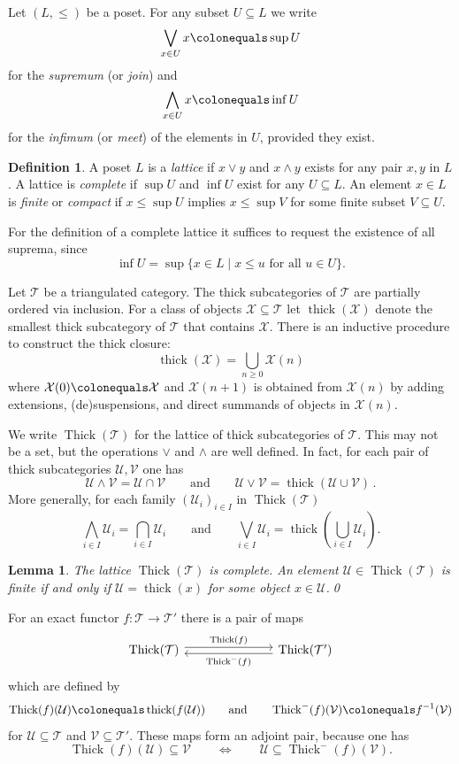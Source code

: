 \documentclass{amsart}[a4]
\newtheorem{lemma}[theorem]{Lemma}
\theoremstyle{definition}
\newtheorem{definition}[theorem]{Definition}
\theoremstyle{remark}
\numberwithin{equation}{section}
\newcommand{\thick}{\operatorname{thick}}
\newcommand{\Thick}{\operatorname{Thick}}
\newcommand{\cat}{\mathcal}
\begin{document}
Let $(L,\le)$ be a poset. For any subset $U\subseteq L$ we write
\[\bigvee_{x\in U}x\colonequals\sup U\] for the \emph{supremum} (or
\emph{join}) and
\[\bigwedge_{x\in U}x\colonequals\inf U\] for the \emph{infimum} (or
\emph{meet}) of the elements in $U$, provided they exist.

\begin{definition}
 A poset $L$ is a
\emph{lattice} if $x\vee y$ and $x\wedge y$ exists for any pair $x,y$
in $L$. A lattice is \emph{complete} if $\sup U$ and $\inf U$ exist for any
$U\subseteq L$. 
An element
$x\in L$ is \emph{finite} or \emph{compact} if $x\le \sup U$ implies
$x\le\sup V$ for some finite subset $V\subseteq U$.
\end{definition}

For the definition of a complete lattice it suffices to request the
existence of all suprema, since
\[\inf U=\sup\{x\in L\mid x\le u\text{ for all }u\in U\}.\]

Let $\cat T$ be a triangulated category. The thick subcategories of
$\cat T$ are partially ordered via inclusion.  For a class of objects
$\cat X\subseteq\cat T$ let $\thick(\cat X)$ denote the smallest thick
subcategory of $\cat T$ that contains $\cat X$. There is an inductive
procedure to construct the thick closure:
\[\thick(\cat X)=\bigcup_{n\ge 0}\cat X(n)\] where $\cat X(0)\colonequals\cat X$
and $\cat X(n+1)$ is obtained from  $\cat X(n)$ by adding
extensions, (de)suspensions, and direct summands of objects in  $\cat X(n)$.

We write $\Thick(\cat T)$ for the lattice of thick subcategories of
$\cat T$.  This may not be a set, but the operations $\vee$ and
$\wedge$ are well defined. In fact, for each pair of thick
subcategories $\cat U,\cat V$ one has
\[\cat U\wedge\cat V=\cat U\cap\cat V\qquad\text{and}\qquad \cat
  U\vee\cat V=\thick(\cat U\cup\cat V)\,.\] More generally, for each
family $(\cat U_i)_{i\in I}$ in $\Thick(\cat T)$
\[\bigwedge_{i\in I}\cat U_i=\bigcap_{i\in I}\cat
  U_i\qquad\text{and}\qquad \bigvee_{i\in I}\cat U_i=\thick\left(\bigcup_{i\in
    I}\cat U_i\right).\]

\begin{lemma}
  The lattice $\Thick(\cat T)$ is complete. An element
  $\cat U\in\Thick(\cat T)$ is finite if and only if
  $\cat U=\thick(x)$ for some object $x\in \cat U$.\qed
\end{lemma}

For an exact functor $f\colon\cat T\to\cat T'$ there is a pair of maps
\begin{equation*}
\begin{tikzcd}[column sep=large]
\Thick(\cat T) \ar[rr,yshift=2.5,"\Thick(f)"] &&  \ar[ll,yshift=-2.5,"\Thick^-(f)"]
\Thick(\cat T')
\end{tikzcd}
\end{equation*}
which are defined by
\[\Thick(f)(\cat U)\colonequals\thick(f(\cat U))\qquad\text{and}\qquad
  \Thick^-(f)(\cat V)\colonequals f^{-1}(\cat V)\]
for $\cat U\subseteq\cat T$ and $\cat V\subseteq\cat T'$. These maps
form an adjoint pair, because one has
\[\Thick(f)(\cat U)\subseteq\cat V\qquad\iff\qquad \cat
  U\subseteq\Thick^-(f)(\cat V).\]
\end{document}
